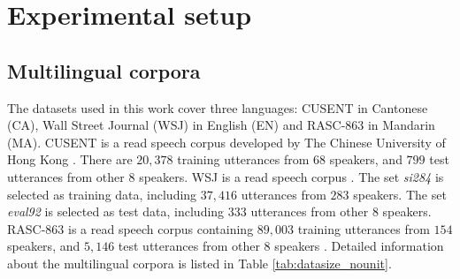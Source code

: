 \documentclass[a4paper]{article}
\begin{document}





\section{Experimental setup}
\label{sec:exp setup}
\subsection{Multilingual corpora}
The datasets used in this work cover three languages: CUSENT in Cantonese (CA), Wall Street Journal (WSJ) in English (EN) and RASC-863 in Mandarin (MA). CUSENT is a read speech corpus  developed by The Chinese University of Hong Kong \cite{LeeLoChingEtAl2002}. There are $20,378$ training utterances from $68$ speakers, and $799$ test utterances from other $8$ speakers. WSJ is a read speech corpus \cite{paul1992design}. The set \emph{si284} is selected as training data, including $37,416$ utterances from $283$ speakers. The set \emph{eval92} is selected as test data, including $333$ utterances from other $8$ speakers. RASC-863 is a read speech corpus containing $89,003$ training utterances from $154$ speakers, and $5,146$ test utterances from other $8$ speakers \cite{li2004rasc863}. Detailed information about the multilingual corpora is listed in Table \ref{tab:datasize_nounit}.
\end{document}
